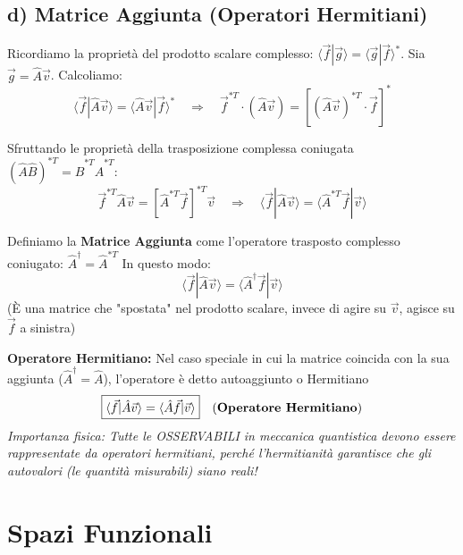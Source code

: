 \documentclass[11pt, a4paper]{article}
\begin{document}
\subsection{d) Matrice Aggiunta (Operatori Hermitiani)} %

Ricordiamo la proprietà del prodotto scalare complesso: $\langle \vec{f} | \vec{g} \rangle = \langle \vec{g} | \vec{f} \rangle^*$. %
Sia $\vec{g} = \hat{A}\vec{v}$. Calcoliamo: %
\begin{equation*}
    \langle \vec{f} | \hat{A}\vec{v} \rangle = \langle \hat{A}\vec{v} | \vec{f} \rangle^* \quad \Rightarrow \quad \vec{f}^{*T} \cdot (\hat{A}\vec{v}) = \left[ (\hat{A}\vec{v})^{*T} \cdot \vec{f} \right]^* %
\end{equation*}

Sfruttando le proprietà della trasposizione complessa coniugata $(\hat{A}\hat{B})^{*T} = \hat{B}^{*T}\hat{A}^{*T}$: %
\begin{equation*}
    \vec{f}^{*T} \hat{A} \vec{v} = [ \hat{A}^{*T} \vec{f} ]^{*T} \vec{v} \quad \Rightarrow \quad \langle \vec{f} | \hat{A}\vec{v} \rangle = \langle \hat{A}^{*T} \vec{f} | \vec{v} \rangle %
\end{equation*}

\noindent
Definiamo la \textbf{Matrice Aggiunta} come l'operatore trasposto complesso coniugato: $\hat{A}^\dagger = \hat{A}^{*T}$ %
In questo modo: %
\begin{equation*}
    \langle \vec{f} | \hat{A}\vec{v} \rangle = \langle \hat{A}^\dagger \vec{f} | \vec{v} \rangle %
\end{equation*}
(È una matrice che "spostata" nel prodotto scalare, invece di agire su $\vec{v}$, agisce su $\vec{f}$ a sinistra) %

\noindent
\textbf{Operatore Hermitiano:} Nel caso speciale in cui la matrice coincida con la sua aggiunta ($\hat{A}^\dagger = \hat{A}$), l'operatore è detto autoaggiunto o Hermitiano %
\begin{equation}
    \boxed{ \langle \vec{f} | \hat{A}\vec{v} \rangle = \langle \hat{A}\vec{f} | \vec{v} \rangle } \quad \text{(\textbf{Operatore Hermitiano})} %
\end{equation}
\textit{Importanza fisica: Tutte le OSSERVABILI in meccanica quantistica devono essere rappresentate da operatori hermitiani, perché l'hermitianità garantisce che gli autovalori (le quantità misurabili) siano reali!}

\section{Spazi Funzionali} %
\end{document}
